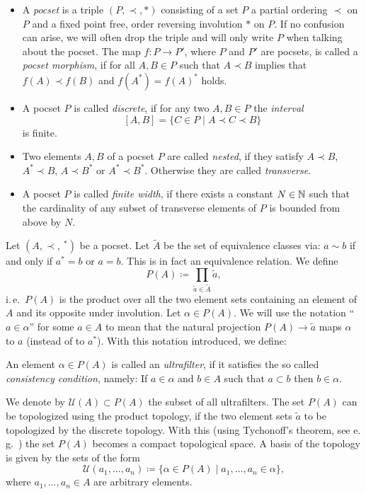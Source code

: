 \begin{defin}
  \begin{itemize}
  \item A \emph{pocset} is a triple \((P, \prec, \ast)\) consisting of a set \(P\) a partial ordering \(\prec\) on \(P\) and a fixed point free, order reversing involution \(\ast\) on \(P\). If no confusion can arise, we will often drop the triple and will only write \(P\) when talking about the pocset. The map \(f \colon P \to P'\), where \(P\) and \(P'\) are pocsets, is called a \emph{pocset morphism}, if for all \(A, B \in P\) such that \(A \prec B\) implies that \(f(A) \prec f(B)\) and \(f(A^\ast) = f(A)^\ast\) holds. 
  \item A pocset \(P\) is called \emph{discrete}, if for any two \(A, B \in P\) the \emph{interval}
    \[
      [A,B] = \{C \in P \mid A \prec C \prec B\}
    \]
    is finite.
  \item Two elements \(A,B\) of a pocset \(P\) are called \emph{nested}, if they satisfy \(A \prec B\), \(A^\ast \prec B\), \(A \prec B^\ast\) or \(A^\ast \prec B^\ast\). Otherwise they are called \emph{transverse}.
  \item A pocset \(P\) is called \emph{finite width}, if there exists a constant \(N \in \mathbb{N}\) such that the cardinality of any subset of transverse elements of \(P\) is bounded from above by \(N\).
  \end{itemize}
\end{defin}


\begin{defin}[Ultrafilter]
  Let \((A, \prec, \ ^\ast)\) be a pocset. Let \(\tilde A\) be the set of equivalence classes via: \(a \sim b\) if and only if \(a^\ast = b\) or \(a = b\). This is in fact an equivalence relation. We define
  \[
    P(A) \coloneqq \prod_{\tilde a \in \tilde A} \tilde a,
  \]
  i.\,e.\ \(P(A)\) is the product over all the two element sets containing an element of \(A\) and its opposite under involution. Let \(\alpha \in P(A)\). We will use the notation \enquote{\(a \in \alpha\)} for some \(a \in A\) to mean that the natural projection \(P(A) \to \tilde a\) maps \(\alpha\) to \(a\) (instead of to \(a^\ast\)). With this notation introduced, we define:
  
  An element \(\alpha \in P(A)\) is called an \emph{ultrafilter}, if it satisfies the so called \emph{consistency condition}, namely: If \(a \in \alpha\) and \(b \in A\) such that \(a \subset b\) then \(b \in \alpha\).

  We denote by \(\mathcal{U}(A) \subset P(A)\) the subset of all ultrafilters. The set \(P(A)\) can be topologized using the product topology, if the two element sets \(\tilde a\) to be topologized by the discrete topology. With this (using Tychonoff's theorem, see e.\,g.~\cite[Chapter~10]{MR1275831}) the set \(P(A)\) becomes a compact topological space. A basis of the topology is given by the sets of the form
\[
  \mathcal{U}(a_1,\dots, a_n) \coloneqq \{\alpha \in P(A) \mid a_1, \dots, a_n \in \alpha\},
\]
where \(a_1,\dots, a_n \in A\) are arbitrary elements.
\end{defin}

